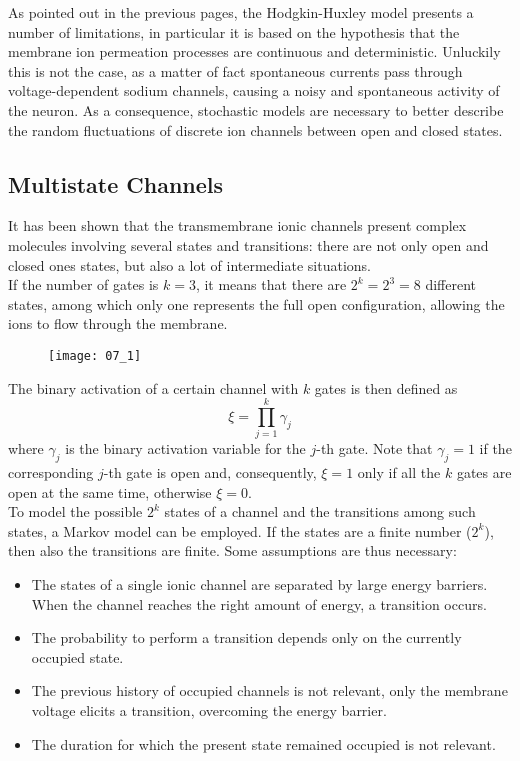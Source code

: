 As pointed out in the previous pages, the Hodgkin-Huxley model presents a number of
limitations, in particular it is based on the hypothesis that the membrane ion
permeation processes are continuous and deterministic. Unluckily this is not the case,
as a matter of fact spontaneous currents pass through voltage-dependent sodium channels,
causing a noisy and spontaneous activity of the neuron. As a consequence, stochastic models
are necessary to better describe the random fluctuations of discrete ion channels between
open and closed states.

\subsection{Multistate Channels}
It has been shown that the transmembrane ionic channels present complex molecules involving
several states and transitions: there are not only open and closed ones states, but also a
lot of intermediate situations.\\
If the number of gates is \(k=3\), it means that there are \(2^{k}=2^{3}=8\) different states,
among which only one represents the full open configuration, allowing the ions to flow
through the membrane.
\begin{figure}[H]
    \texttt{[image: 07\_1]}
    \centering
\end{figure}
The binary activation of a certain channel with \(k\) gates is then defined as
\begin{equation*}
    \xi=\prod_{j=1}^{k}\gamma_{j}
\end{equation*}
where \(\gamma_{j}\) is the binary activation variable for the \(j\)-th gate. Note that
\(\gamma_{j}=1\) if the corresponding \(j\)-th gate is open and, consequently, \(\xi=1\)
only if all the \(k\) gates are open at the same time, otherwise \(\xi=0\).\\
To model the possible \(2^{k}\) states of a channel and the transitions among such states,
a Markov model can be employed. If the states are a finite number (\(2^{k}\)), then also the
transitions are finite.\newpage
Some assumptions are thus necessary:
\begin{itemize}
    \item The states of a single ionic channel are separated by large energy barriers. When the
          channel reaches the right amount of energy, a transition occurs.
    \item The probability to perform a transition depends only on the currently occupied state.
    \item The previous history of occupied channels is not relevant, only the membrane voltage elicits
          a transition, overcoming the energy barrier.
    \item The duration for which the present state remained occupied is not relevant.
\end{itemize}
